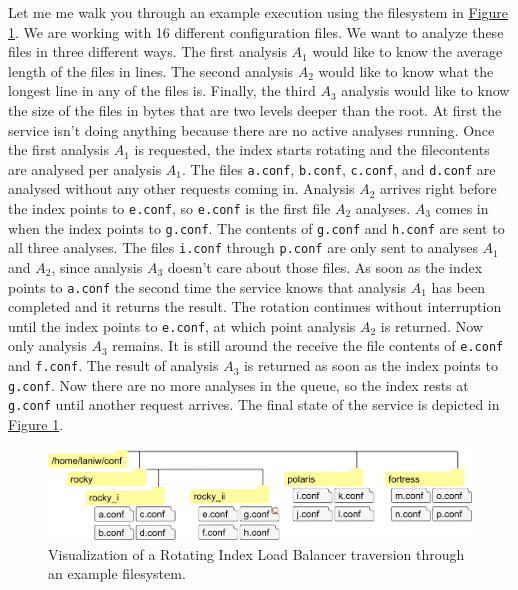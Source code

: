 \documentclass[11pt]{article} %
\newcommand{\rilb}{Rotating Index Load Balancer }
\newcommand{\hidelinks}[1]{{\hypersetup{hidelinks}#1}}
\newcommand{\figref}[1]{\hidelinks{\hyperref[#1]{Figure \ref{#1}}}}
\begin{document}
  Let me me walk you through an example execution using the filesystem in \figref{fig:rilb-vis}. We are working with 16 different configuration files. We want to analyze these files in three different ways. The first analysis $A_1$ would like to know the average length of the files in lines. The second analysis $A_2$ would like to know what the longest line in any of the files is. Finally, the third $A_3$ analysis would like to know the size of the files in bytes that are two levels deeper than the root. At first the service isn't doing anything because there are no active analyses running. Once the first analysis $A_1$ is requested, the index starts rotating and the filecontents are analysed per analysis $A_1$. The files \texttt{a.conf}, \texttt{b.conf}, \texttt{c.conf}, and \texttt{d.conf} are analysed without any other requests coming in. Analysis $A_2$ arrives right before the index points to \texttt{e.conf}, so \texttt{e.conf} is the first file $A_2$ analyses. $A_3$ comes in when the index points to \texttt{g.conf}. The contents of \texttt{g.conf} and \texttt{h.conf} are sent to all three analyses. The files \texttt{i.conf} through \texttt{p.conf} are only sent to analyses $A_1$ and $A_2$, since analysis $A_3$ doesn't care about those files. As soon as the index points to \texttt{a.conf} the second time the service knows that analysis $A_1$ has been completed and it returns the result. The rotation continues without interruption until the index points to \texttt{e.conf}, at  which point analysis $A_2$ is returned. Now only analysis $A_3$ remains. It is still around the receive the file contents of \texttt{e.conf} and \texttt{f.conf}. The result of analysis $A_3$ is returned as soon as the index points to \texttt{g.conf}. Now there are no more analyses in the queue, so the index rests at \texttt{g.conf} until another request arrives. The  final state of the service is depicted in \figref{fig:rilb-vis}.

  \begin{figure}[H]
    \centering
    \includegraphics[width=.99\linewidth, keepaspectratio]{res/rilb_visualization}
    \caption{Visualization of a \rilb traversion through an example filesystem.}
    \label{fig:rilb-vis}
  \end{figure}
\end{document}
